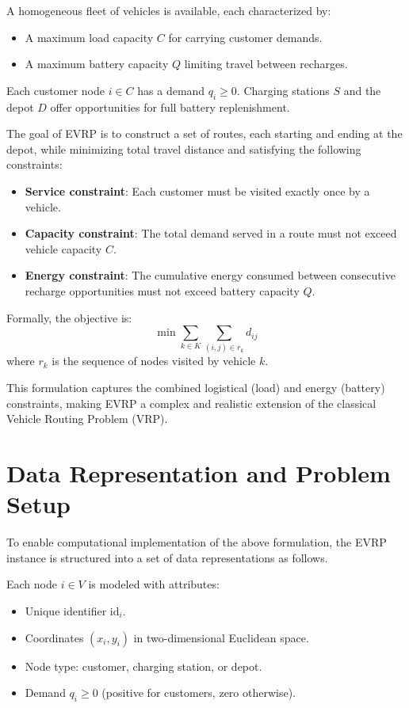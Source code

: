A homogeneous fleet of vehicles is available, each characterized by:
\begin{itemize}
    \item A maximum load capacity \( C \) for carrying customer demands.
    \item A maximum battery capacity \( Q \) limiting travel between recharges.
\end{itemize}

Each customer node \( i \in C \) has a demand \( q_i \geq 0 \). Charging stations \( S \) and the depot \( D \) offer opportunities for full battery replenishment.

The goal of EVRP is to construct a set of routes, each starting and ending at the depot, while minimizing total travel distance and satisfying the following constraints:

\begin{itemize}
    \item \textbf{Service constraint}: Each customer must be visited exactly once by a vehicle.
    \item \textbf{Capacity constraint}: The total demand served in a route must not exceed vehicle capacity \( C \).
    \item \textbf{Energy constraint}: The cumulative energy consumed between consecutive recharge opportunities must not exceed battery capacity \( Q \).
\end{itemize}

Formally, the objective is:
\[
\min \sum_{k \in K} \sum_{(i, j) \in r_k} d_{ij}
\]
where \( r_k \) is the sequence of nodes visited by vehicle \( k \).

This formulation captures the combined logistical (load) and energy (battery) constraints, making EVRP a complex and realistic extension of the classical Vehicle Routing Problem (VRP).

\bigskip

\section{Data Representation and Problem Setup}
\label{sec:data_modeling}

To enable computational implementation of the above formulation, the EVRP instance is structured into a set of data representations as follows.

Each node \( i \in V \) is modeled with attributes:
\begin{itemize}
    \item Unique identifier \( \text{id}_i \).
    \item Coordinates \( (x_i, y_i) \) in two-dimensional Euclidean space.
    \item Node type: customer, charging station, or depot.
    \item Demand \( q_i \geq 0 \) (positive for customers, zero otherwise).
\end{itemize}

